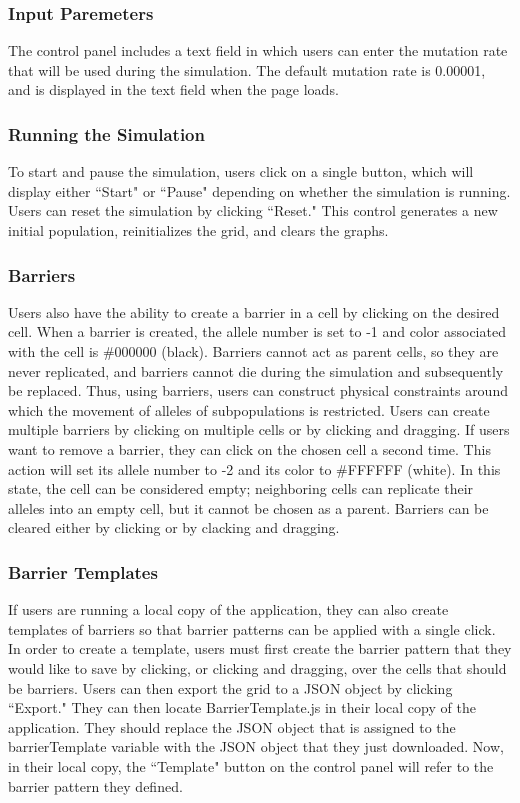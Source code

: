 \documentclass[12pt]{article}
\begin{document}
\begin{spacing}{1.5}
\subsubsection{Input Paremeters}
The control panel includes a text field in which users can enter the mutation rate that will be used during the simulation. The default mutation rate is 0.00001, and is displayed in the text field when the page loads.

\subsubsection{Running the Simulation}
To start and pause the simulation, users click on a single button, which will display either ``Start" or ``Pause" depending on whether the simulation is running. Users can reset the simulation by clicking ``Reset." This control generates a new initial population, reinitializes the grid, and clears the graphs.

\subsubsection{Barriers}
Users also have the ability to create a barrier in a cell by clicking on the desired cell. When a barrier is created, the allele number is set to -1 and color associated with the cell is \#000000 (black). Barriers cannot act as parent cells, so they are never replicated, and barriers cannot die during the simulation and subsequently be replaced. Thus, using barriers, users can construct physical constraints around which the movement of alleles of subpopulations is restricted. Users can create multiple barriers by clicking on multiple cells or by clicking and dragging. If users want to remove a barrier, they can click on the chosen cell a second time. This action will set its allele number to -2 and its color to \#FFFFFF (white). In this state, the cell can be considered empty; neighboring cells can replicate their alleles into an empty cell, but it cannot be chosen as a parent. Barriers can be cleared either by clicking or by clacking and dragging.

\subsubsection{Barrier Templates}
If users are running a local copy of the application, they can also create templates of barriers so that barrier patterns can be applied with a single click. In order to create a template, users must first create the barrier pattern that they would like to save by clicking, or clicking and dragging, over the cells that should be barriers. Users can then export the grid to a JSON object by clicking ``Export." They can then locate BarrierTemplate.js in their local copy of the application. They should replace the JSON object that is assigned to the barrierTemplate variable with the JSON object that they just downloaded. Now, in their local copy, the ``Template" button on the control panel will refer to the barrier pattern they defined.


\end{spacing}
\end{document}
